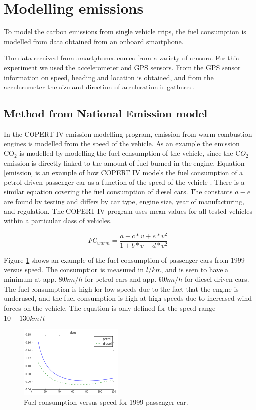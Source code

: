 \section{Modelling emissions}

To model the carbon emissions from single vehicle trips, the fuel consumption is modelled from data obtained from an onboard smartphone.
\label{sec:modeling}

The data received from smartphones comes from a variety of sensors. For this experiment we used the accelerometer and GPS sensors. From the GPS sensor information on speed, heading and location is obtained, and from the accelerometer the size and direction of acceleration is gathered.

\subsection{Method from National Emission model}

In the COPERT IV emission modelling program, emission from warm combustion engines is modelled from the speed of the vehicle. As an example the emission CO$_2$ is modelled by modelling the fuel consumption of the vehicle, since the C$O_2$ emission is directly linked to the amount of fuel burned in the engine. Equation \ref{emission} is an example of how COPERT IV models the fuel consumption of a petrol driven passenger car as a function of the speed of the vehicle \cite{Ntziachristos2012}. There is a similar equation covering the fuel consumption of diesel cars. The constants $a-e$ are found by testing and differs by car type, engine size, year of manufacturing, and regulation. The COPERT IV program uses mean values for all tested vehicles within a particular class of vehicles.

\begin{equation}
	FC_{warm} = \frac{a + c*v + e*v^2}{1 + b*v + d*v^2}
	\label{emission}
\end{equation}

Figure \ref{FC} shows an example of the fuel consumption of passenger cars from 1999 versus speed. The consumption is measured in $l/km$, and is seen to have a minimum at app. $80 km/h$ for petrol cars and app. $60 km/h$ for diesel driven cars. The fuel consumption is high for low speeds due to the fact that the engine is underused, and the fuel consumption is high at high speeds due to increased wind forces on the vehicle. The equation is only defined for the speed range $10 - 130 km/t$
 
\begin{figure}[h]
	\centering
  \includegraphics[width=0.45\textwidth]{fc_dieselpetrol}
  \caption{Fuel consumption versus speed for 1999 passenger car.}
  \label{FC}
\end{figure}

